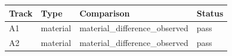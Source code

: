 \begin{tabular}{llll}
\toprule
Track & Type & Comparison & Status \\
\midrule
A1 & material & material\_difference\_observed & pass \\
A2 & material & material\_difference\_observed & pass \\
\bottomrule
\end{tabular}
